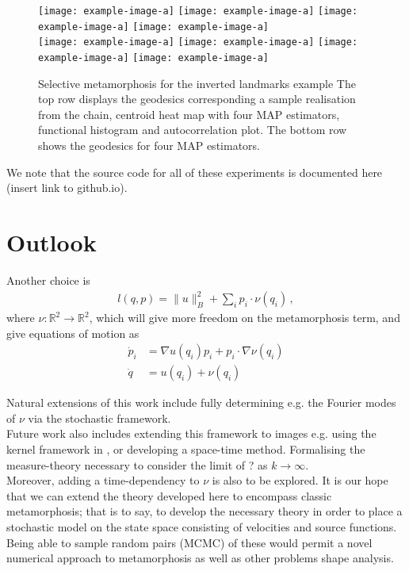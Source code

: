 \documentclass[runningheads]{llncs}
\begin{document}
\begin{figure}
\centering
\begin{minipage}{\textwidth}
  \centering
    \texttt{[image: example-image-a]}\quad
    \texttt{[image: example-image-a]}\quad
    \texttt{[image: example-image-a]}\quad
    \texttt{[image: example-image-a]}\\[0.25cm]
    \texttt{[image: example-image-a]}\quad
    \texttt{[image: example-image-a]}\quad
    \texttt{[image: example-image-a]}\quad
    \texttt{[image: example-image-a]}
    \caption{Selective metamorphosis for the inverted landmarks example The top
    row displays the geodesics corresponding a sample realisation from the
    chain, centroid heat map with four MAP estimators, functional histogram and
    autocorrelation plot. The bottom row shows the geodesics for four MAP
    estimators.}
    \label{fig:selective:triangle}
\end{minipage}
\end{figure}

We note that the source code for all of these experiments is documented
here (insert link to github.io). 

\section{Outlook}\label{sec:outlook}
Another choice is 
\begin{align}
    l(q,p) = \|u\|_B^2 + \sum_i p_i\cdot \nu(q_i) \, , 
\end{align}
where $\nu:\mathbb R^2 \to \mathbb R^2$, which will give more freedom on the metamorphosis term, and give equations of motion as 
\begin{align}
    \dot p_i  &= \nabla u(q_i)p_i  + p_i \cdot \nabla \nu(q_i)\\
    \dot q &= u(q_i) + \nu(q_i) 
\end{align}

Natural extensions of this work include fully determining e.g. the Fourier modes
of $\nu$ via the stochastic framework.\\

Future work also includes extending this framework to images e.g. using the
kernel framework in \cite{richardson2016metamorphosis}, or developing a
space-time method. Formalising the measure-theory necessary to consider the
limit of ? as $k\rightarrow\infty$.\\

Moreover, adding a time-dependency to $\nu$ is also to be
explored. It is our hope that we can extend the theory developed here to
encompass classic metamorphosis; that is to say, to develop the necessary theory
in order to place a stochastic model on the state space consisting of
velocities and source functions. Being able to sample random pairs (MCMC) of these
would permit a novel numerical approach to metamorphosis as well as other
problems shape analysis.



\end{document}
